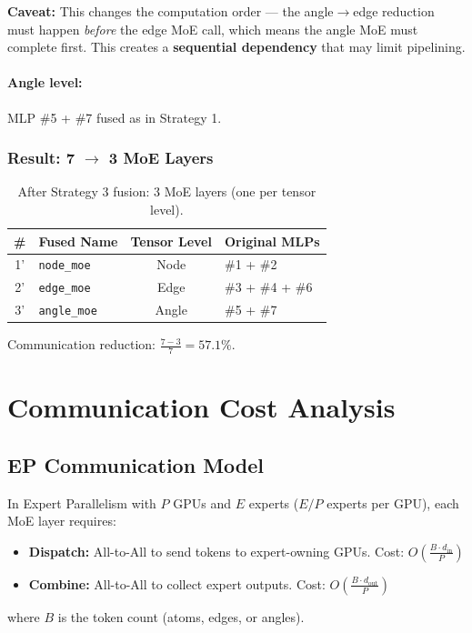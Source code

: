 \documentclass[11pt,a4paper]{article}
\begin{document}
\textbf{Caveat:} This changes the computation order --- the angle$\to$edge reduction must happen \textit{before} the edge MoE call, which means the angle MoE must complete first. This creates a \textbf{sequential dependency} that may limit pipelining.

\paragraph{Angle level:} MLP \#5 + \#7 fused as in Strategy 1.

\subsubsection{Result: 7 $\to$ 3 MoE Layers}

\begin{table}[h]
\centering
\begin{tabular}{clcl}
\toprule
\# & Fused Name & Tensor Level & Original MLPs \\
\midrule
1' & \texttt{node\_moe} & Node & \#1 + \#2 \\
2' & \texttt{edge\_moe} & Edge & \#3 + \#4 + \#6 \\
3' & \texttt{angle\_moe} & Angle & \#5 + \#7 \\
\bottomrule
\end{tabular}
\caption{After Strategy 3 fusion: 3 MoE layers (one per tensor level).}
\end{table}

Communication reduction: $\frac{7-3}{7} = 57.1\%$.

\section{Communication Cost Analysis}

\subsection{EP Communication Model}

In Expert Parallelism with $P$ GPUs and $E$ experts ($E/P$ experts per GPU), each MoE layer requires:
\begin{itemize}
    \item \textbf{Dispatch:} All-to-All to send tokens to expert-owning GPUs. Cost: $O\!\left(\frac{B \cdot d_{\text{in}}}{P}\right)$
    \item \textbf{Combine:} All-to-All to collect expert outputs. Cost: $O\!\left(\frac{B \cdot d_{\text{out}}}{P}\right)$
\end{itemize}
where $B$ is the token count (atoms, edges, or angles).
\end{document}
